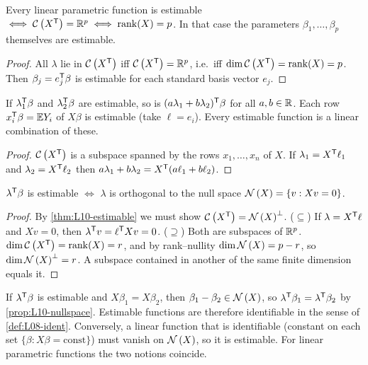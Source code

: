\begin{corollary}\label{cor:L10-fullrank}
Every linear parametric function is estimable $\iff\mathcal{C}\left(X^{\mathsf T}\right)=\mathbb R^p\iff\operatorname{rank}(X)=p$.
In that case the parameters $\beta_1,\dots,\beta_p$ themselves are estimable.
\end{corollary}
\begin{proof}
All $\lambda$ lie in $\mathcal{C}\left(X^{\mathsf T}\right)$ iff $\mathcal{C}\left(X^{\mathsf T}\right)=\mathbb R^p$, i.e.\ iff $\dim\mathcal{C}\left(X^{\mathsf T}\right)=\operatorname{rank}(X)=p$.
Then $\beta_j=e_j^{\mathsf T}\beta$ is estimable for each standard basis vector $e_j$.
\end{proof}

\begin{corollary}\label{cor:L10-subspace}
If $\lambda_1^{\mathsf T}\beta$ and $\lambda_2^{\mathsf T}\beta$ are estimable, so is $(a\lambda_1+b\lambda_2)^{\mathsf T}\beta$ for all
$a,b\in\mathbb R$. Each row $x_i^{\mathsf T}\beta=\mathbb E Y_i$ of $X\beta$ is estimable (take $\ell=e_i$). Every estimable
function is a linear combination of these.
\end{corollary}
\begin{proof}
$\mathcal{C}\left(X^{\mathsf T}\right)$ is a subspace spanned by the rows $x_1,\dots,x_n$ of $X$. If
$\lambda_1=X^{\mathsf T}\ell_1$ and $\lambda_2=X^{\mathsf T}\ell_2$ then $a\lambda_1+b\lambda_2=X^{\mathsf T}(a\ell_1+b\ell_2)$.
\end{proof}

\begin{proposition}\label{prop:L10-nullspace}
$\lambda^{\mathsf T}\beta$ is estimable $\iff$ $\lambda$ is orthogonal to the null space $\mathcal{N}\left(X\right)=\{v:Xv=0\}$.
\end{proposition}
\begin{proof}
By \cref{thm:L10-estimable} we must show $\mathcal{C}\left(X^{\mathsf T}\right)=\mathcal{N}\left(X\right)^\perp$.
($\subseteq$) If $\lambda=X^{\mathsf T}\ell$ and $Xv=0$, then $\lambda^{\mathsf T} v=\ell^{\mathsf T} Xv=0$.
($\supseteq$) Both are subspaces of $\mathbb R^p$. $\dim\mathcal{C}\left(X^{\mathsf T}\right)=\operatorname{rank}(X)=r$, and by rank--nullity
$\dim\mathcal{N}\left(X\right)=p-r$, so $\dim\mathcal{N}\left(X\right)^\perp=r$. A subspace contained in another of the same
finite dimension equals it.
\end{proof}

\begin{note}
If $\lambda^{\mathsf T}\beta$ is estimable and $X\beta_1=X\beta_2$, then $\beta_1-\beta_2\in\mathcal{N}\left(X\right)$, so
$\lambda^{\mathsf T}\beta_1=\lambda^{\mathsf T}\beta_2$ by \cref{prop:L10-nullspace}. Estimable functions are therefore
identifiable in the sense of \cref{def:L08-ident}. Conversely, a linear function that is
identifiable (constant on each set $\{\beta: X\beta=\text{const}\}$) must vanish on $\mathcal{N}\left(X\right)$, so it
is estimable. For linear parametric functions the two notions coincide.
\end{note}

